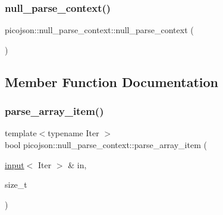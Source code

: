\subsubsection{\texorpdfstring{null\+\_\+parse\+\_\+context()}{null\_parse\_context()}}
{\footnotesize\ttfamily picojson\+::null\+\_\+parse\+\_\+context\+::null\+\_\+parse\+\_\+context (\begin{DoxyParamCaption}{ }\end{DoxyParamCaption})\hspace{0.3cm}{\ttfamily [inline]}}



\subsection{Member Function Documentation}
\hypertarget{classpicojson_1_1null__parse__context_a6623f92117dd6dc7bca60e9e9463a1a0}{}\label{classpicojson_1_1null__parse__context_a6623f92117dd6dc7bca60e9e9463a1a0} 
\subsubsection{\texorpdfstring{parse\+\_\+array\+\_\+item()}{parse\_array\_item()}}
{\footnotesize\ttfamily template$<$typename Iter $>$ \\
bool picojson\+::null\+\_\+parse\+\_\+context\+::parse\+\_\+array\+\_\+item (\begin{DoxyParamCaption}\item[{\hyperlink{classpicojson_1_1input}{input}$<$ Iter $>$ \&}]{in,  }\item[{size\+\_\+t}]{ }\end{DoxyParamCaption})\hspace{0.3cm}{\ttfamily [inline]}}

\hypertarget{classpicojson_1_1null__parse__context_ae78f8991e157a85b7ce0fb36f9a5f628}{}\label{classpicojson_1_1null__parse__context_ae78f8991e157a85b7ce0fb36f9a5f628} 
